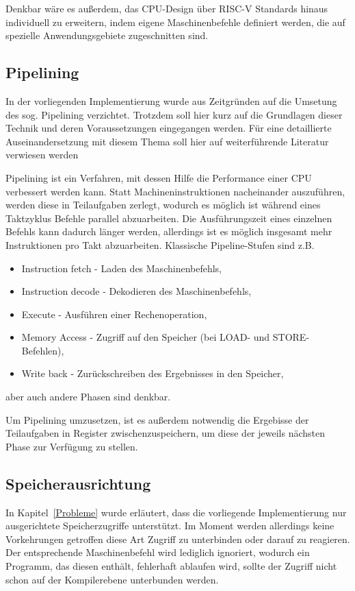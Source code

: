 Denkbar wäre es außerdem, das CPU-Design über RISC-V Standards hinaus individuell zu erweitern, indem eigene Maschinenbefehle definiert werden, die auf spezielle Anwendungsgebiete zugeschnitten sind.

\subsection{Pipelining}
In der vorliegenden Implementierung wurde aus Zeitgründen auf die Umsetung des sog. Pipelining verzichtet. 
Trotzdem soll hier kurz auf die Grundlagen dieser Technik und deren Voraussetzungen eingegangen werden.
Für eine detaillierte Auseinandersetzung mit diesem Thema soll hier auf weiterführende Literatur verwiesen werden~\cite[A-2 ff.]{Hennessy}

Pipelining ist ein Verfahren, mit dessen Hilfe die Performance einer CPU verbessert werden kann.
Statt Machineninstruktionen nacheinander auszuführen, werden diese in Teilaufgaben zerlegt, wodurch es möglich ist während eines Taktzyklus Befehle parallel abzuarbeiten.
Die Ausführungszeit eines einzelnen Befehls kann dadurch länger werden, allerdings ist es möglich insgesamt mehr Instruktionen pro Takt abzuarbeiten.
Klassische Pipeline-Stufen sind z.B.
\begin{itemize}
    \item Instruction fetch - Laden des Maschinenbefehls,
    \item Instruction decode - Dekodieren des Maschinenbefehls,
    \item Execute - Ausführen einer Rechenoperation,
    \item Memory Access - Zugriff auf den Speicher (bei LOAD- und STORE-Befehlen),
    \item Write back - Zurückschreiben des Ergebnisses in den Speicher,
\end{itemize}
aber auch andere Phasen sind denkbar.

Um Pipelining umzusetzen, ist es außerdem notwendig die Ergebisse der Teilaufgaben in Register zwischenzuspeichern, um diese der jeweils nächsten Phase zur Verfügung zu stellen.







\subsection{Speicherausrichtung}
In Kapitel~\ref{Probleme} wurde erläutert, dass die vorliegende Implementierung nur ausgerichtete Speicherzugriffe unterstützt.
Im Moment werden allerdings keine Vorkehrungen getroffen diese Art Zugriff zu unterbinden oder darauf zu reagieren.
Der entsprechende Maschinenbefehl wird lediglich ignoriert, wodurch ein Programm, das diesen enthält, fehlerhaft ablaufen wird, sollte der Zugriff nicht schon auf der Kompilerebene unterbunden werden.

